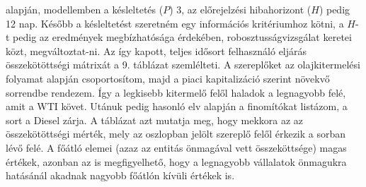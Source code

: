 \documentclass[12pt,bibliography=totoc]{article}
\begin{document}


\cite{diebold2012better} alapján, modellemben a késleltetés ($P$) 3, az előrejelzési hibahorizont ($H$) pedig 12 nap. Később a késleltetést szeretném egy információs kritériumhoz kötni, a $H$-t pedig az eredmények megbízhatósága érdekében, robosztusságvizsgálat keretei közt, megváltoztat-ni. Az így kapott, teljes idősort felhasználó eljárás összekötöttségi mátrixát a 9. táblázat szemlélteti. A szereplőket az olajkitermelési folyamat alapján csoportosítom, majd a piaci kapitalizáció szerint növekvő sorrendbe rendezem. Így a legkisebb kitermelő felől haladok a legnagyobb felé, amit a WTI követ. Utánuk pedig hasonló elv alapján a finomítókat listázom, a sort a Diesel zárja. A táblázat azt mutatja meg, hogy mekkora az az összekötöttségi mérték, mely az oszlopban jelölt szereplő felől érkezik a sorban lévő felé. A főátló elemei (azaz az entitás önmagával vett összeköttsége) magas értékek, azonban az is megfigyelhető, hogy a legnagyobb vállalatok önmagukra hatásánál akadnak nagyobb főátlón kívüli értékek is. 
\end{document}
